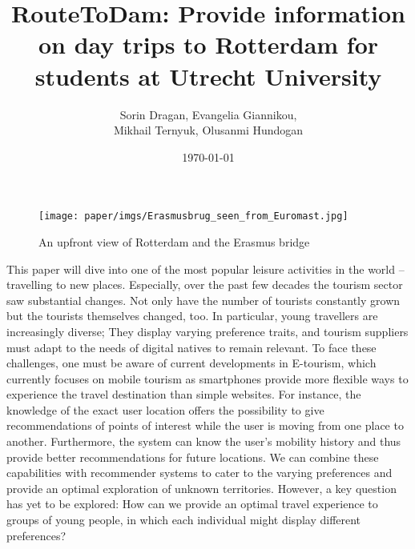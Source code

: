 \documentclass[11pt,a4paper,oneside]{article}
\title{\textbf{RouteToDam: Provide information on day trips to Rotterdam for students at Utrecht University}\newline \newline \newline}
\date{\today}
\author{Sorin Dragan, Evangelia Giannikou, \\Mikhail Ternyuk, Olusanmi Hundogan}
\begin{document}
\maketitle


\begin{figure}[H]
    \texttt{[image: paper/imgs/Erasmusbrug\_seen\_from\_Euromast.jpg]}
    \caption{An upfront view of Rotterdam and the Erasmus bridge}
\end{figure}


\clearpage
This paper will dive into one of the most popular leisure activities in the world -- travelling to new places.
Especially, over the past few decades the tourism sector saw substantial changes.\cite{smeral_StructuralViewTourism_2003}\cite{doi:10.18111/wtobarometereng.2020.18.1.1} Not only have the number of tourists constantly grown but the tourists themselves changed, too.\cite{OECD2020}
In particular, young travellers are increasingly diverse; They display varying preference traits, and tourism suppliers must adapt to the needs of digital natives to remain relevant.\cite{europeantravelcommission_StudyGenerationTravellers_2020}  To face these challenges, one must be aware of current developments in E-tourism, which currently focuses on mobile tourism as smartphones provide more flexible ways to experience the travel destination than simple websites.\cite{mobile_recommendation_systems} For instance, the knowledge of the exact user location offers the possibility to give recommendations of points of interest while the user is moving from one place to another. Furthermore, the system can know the user's mobility history and thus provide better recommendations for future locations. We can combine these capabilities with recommender systems to cater to the varying preferences and provide an optimal exploration of unknown territories. However, a key question has yet to be explored: How can we provide an optimal travel experience to groups of young people, in which each individual might display different preferences? 
\end{document}
